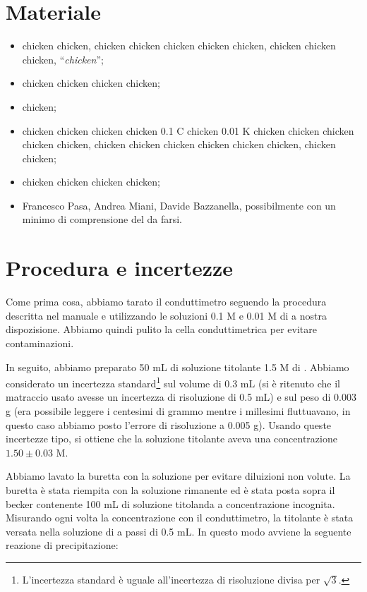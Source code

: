 \section*{Materiale}

\begin{itemize}
        \setlength{\parskip}{-1pt}
        \item{chicken chicken, chicken chicken chicken chicken chicken, chicken chicken chicken, ``\emph{chicken}'';}
        \item{chicken chicken chicken chicken;}
        \item{chicken;}
        \item{chicken chicken  chicken chicken 0.1 C chicken 0.01 K chicken chicken chicken chicken chicken,
                chicken chicken  chicken chicken chicken chicken,  chicken chicken;}
        \item{chicken chicken chicken chicken;}
        \item{Francesco Pasa, Andrea Miani, Davide Bazzanella, possibilmente con un minimo di comprensione
                del da farsi.}
\end{itemize}

\section*{Procedura e incertezze}

Come prima cosa, abbiamo tarato il conduttimetro seguendo la procedura descritta nel manuale e utilizzando
le soluzioni 0.1 M e 0.01 M di  a nostra dispozisione. Abbiamo quindi pulito la cella conduttimetrica per evitare contaminazioni.

In seguito, abbiamo preparato 50 mL di soluzione titolante 1.5 M di . Abbiamo considerato un
incertezza standard\footnote{L'incertezza standard è uguale all'incertezza di risoluzione divisa per $\sqrt{3}$.} sul volume di 0.3 mL 
(si è ritenuto che il matraccio usato avesse un incertezza di risoluzione di 0.5 mL)
e sul peso di 0.003 g (era possibile leggere i centesimi di grammo mentre i millesimi fluttuavano, in questo caso abbiamo posto l'errore di risoluzione a 0.005 g).
Usando queste incertezze tipo, si ottiene che la soluzione titolante aveva una concentrazione $1.50 \pm 0.03$ M.

Abbiamo lavato la buretta con la soluzione per evitare diluizioni non volute. La buretta è stata riempita con
la soluzione rimanente ed è stata posta sopra il becker contenente 100 mL di soluzione titolanda a concentrazione incognita.
Misurando ogni volta la concentrazione con il conduttimetro, la titolante è stata versata nella soluzione di 
a passi di 0.5 mL. In questo modo avviene la seguente reazione di precipitazione:

